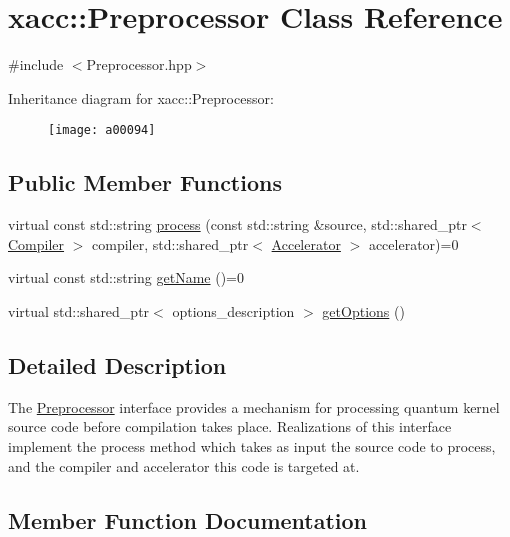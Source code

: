 \hypertarget{a00094}{}\section{xacc\+:\+:Preprocessor Class Reference}
\label{a00094}


{\ttfamily \#include $<$Preprocessor.\+hpp$>$}

Inheritance diagram for xacc\+:\+:Preprocessor\+:\begin{figure}[H]
\begin{center}
\leavevmode
\texttt{[image: a00094]}
\end{center}
\end{figure}
\subsection*{Public Member Functions}
\begin{DoxyCompactItemize}
\item 
virtual const std\+::string \hyperlink{a00094_ae59b5a2963f8bcc84b590a83f4749e19}{process} (const std\+::string \&source, std\+::shared\+\_\+ptr$<$ \hyperlink{a00034}{Compiler} $>$ compiler, std\+::shared\+\_\+ptr$<$ \hyperlink{a00017}{Accelerator} $>$ accelerator)=0
\item 
virtual const std\+::string \hyperlink{a00094_a36671f4c062d61e230306edc404774cd}{get\+Name} ()=0
\item 
virtual std\+::shared\+\_\+ptr$<$ options\+\_\+description $>$ \hyperlink{a00094_a96f5600ea47628b66917c7b90250e7f1}{get\+Options} ()
\end{DoxyCompactItemize}


\subsection{Detailed Description}
The \hyperlink{a00094}{Preprocessor} interface provides a mechanism for processing quantum kernel source code before compilation takes place. Realizations of this interface implement the process method which takes as input the source code to process, and the compiler and accelerator this code is targeted at. 

\subsection{Member Function Documentation}
